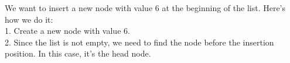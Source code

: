 \documentclass[preview]{standalone}
\begin{document}
We want to insert a new node with value 6 at the beginning of the list. Here's how we do it:\\1. Create a new node with value 6.\\2. Since the list is not empty, we need to find the node before the insertion position. In this case, it's the head node.\\
\end{document}
